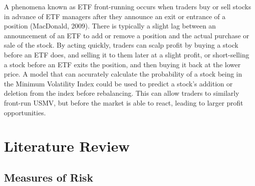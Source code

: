 \documentclass[12pt,twoside]{reedthesis}
\theoremstyle{definition}
\theoremstyle{definition}
\theoremstyle{definition}
\theoremstyle{remark}
\begin{document}
A phenomena known as ETF front-running occurs when traders buy or sell
stocks in advance of ETF managers after they announce an exit or
entrance of a position (MacDonald, 2009). There is typically a slight
lag between an announcement of an ETF to add or remove a position and
the actual purchase or sale of the stock. By acting quickly, traders can
scalp profit by buying a stock before an ETF does, and selling it to
them later at a slight profit, or short-selling a stock before an ETF
exits the position, and then buying it back at the lower price. A model
that can accurately calculate the probability of a stock being in the
Minimum Volatility Index could be used to predict a stock's addition or
deletion from the index before rebalancing. This can allow traders to
similarly front-run USMV, but before the market is able to react,
leading to larger profit opportunities.

\chapter{Literature Review}\label{literature-review}

\section{Measures of Risk}\label{measures-of-risk}
\end{document}
